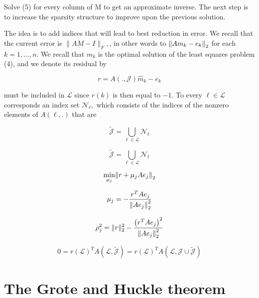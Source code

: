 \documentclass[paper=A4, fontsize=11pt]{scrartcl}
\let\originalleft\left
\let\originalright\right
\renewcommand{\left}{\mathopen{}\mathclose\bgroup\originalleft}
\renewcommand{\right}{\aftergroup\egroup\originalright}
\theoremstyle{remark}
\begin{document}
	Solve (5) for every column of M to get an approximate inverse. The next 
	step is to increase the sparsity structure to improve upon the previous solution.
	
	The idea is to add indices that will lead to best reduction in error. We recall that the current error is \(\|A M-I\|_{F},\), in other words to \(\left\|A m_{k}-e_{k}\right\|_{2}\) for each \(k=1, \ldots, n .\) We recall that \(m_{k}\) is the optimal solution of the least squares problem (4), and we denote its residual by
	
	\begin{equation}
	r=A( ., \mathcal{J}) \hat{m}_{k}-e_{k}
	\end{equation}
	
	must be included in \(\mathcal{L}\) since \(r(k)\) is then equal to \(-1 .\) To every \(\ell \in \mathcal{L}\) corresponds an
	index set \(\mathcal{N}_{\ell},\) which consists of the indices of the nonzero elements of \(A(\ell, .)\) that are
	
	
	\begin{equation}
	\tilde{\mathcal{J}}=\bigcup_{\ell \in \mathcal{L}} \mathcal{N}_{\ell}
	\end{equation}
	
	\begin{equation}
	\tilde{\mathcal{J}}=\bigcup_{\ell \in \mathcal{L}} \mathcal{N}_{\ell}
	\end{equation}
	
	\begin{equation}
	\min _{\mu_{j}}\left\|r+\mu_{j} A e_{j}\right\|_{2}
	\end{equation}
	
	\begin{equation}
	\mu_{j}=-\frac{r^{T} A e_{j}}{\left\|A e_{j}\right\|_{2}^{2}}
	\end{equation}
	
	\begin{equation}
	\rho_{j}^{2}=\|r\|_{2}^{2}-\frac{\left(r^{T} A e_{j}\right)^{2}}{\left\|A e_{j}\right\|_{2}^{2}}
	\end{equation}
	
	\begin{equation}
	0=r(\mathcal{L})^{T} A(\mathcal{L}, \tilde{\mathcal{J}})=r(\mathcal{L})^{T} A(\mathcal{L}, \mathcal{J} \cup \tilde{\mathcal{J}})
	\end{equation}
	
	\newpage
	
	
\section{The Grote and Huckle theorem}
\end{document}
